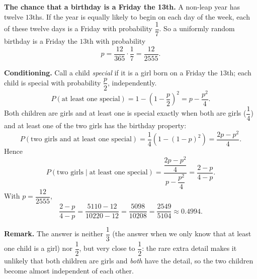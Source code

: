 \textbf{The chance that a birthday is a Friday the 13th.} A non-leap year has twelve $13$ths. If the year is equally likely to begin on each day of the week, each of these twelve days is a Friday with probability $\dfrac{1}{7}$. So a uniformly random birthday is a Friday the $13$th with probability
\[
p=\dfrac{12}{365}\cdot\dfrac{1}{7}=\dfrac{12}{2555}.
\]

\textbf{Conditioning.} Call a child \emph{special} if it is a girl born on a Friday the $13$th; each child is special with probability $\dfrac{p}{2}$, independently.
\[
P(\text{at least one special})=1-\left(1-\dfrac{p}{2}\right)^2=p-\dfrac{p^2}{4}.
\]
Both children are girls and at least one is special exactly when both are girls ($\dfrac{1}{4}$) and at least one of the two girls has the birthday property:
\[
P(\text{two girls and at least one special})=\dfrac{1}{4}\left(1-(1-p)^2\right)=\dfrac{2p-p^2}{4}.
\]
Hence
\[
P(\text{two girls}\mid\text{at least one special})=\dfrac{\dfrac{2p-p^2}{4}}{p-\dfrac{p^2}{4}}=\dfrac{2-p}{4-p}.
\]
With $p=\dfrac{12}{2555}$,
\[
\dfrac{2-p}{4-p}=\dfrac{5110-12}{10220-12}=\dfrac{5098}{10208}=\boxed{\dfrac{2549}{5104}}\approx0.4994 .
\]

\textbf{Remark.} The answer is neither $\dfrac{1}{3}$ (the answer when we only know that at least one child is a girl) nor $\dfrac{1}{2}$, but very close to $\dfrac{1}{2}$: the rare extra detail makes it unlikely that both children are girls and \emph{both} have the detail, so the two children become almost independent of each other.
